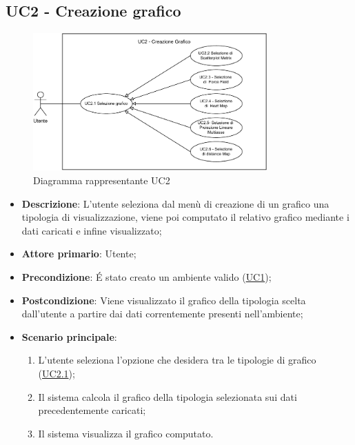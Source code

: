 \subsection{UC2 - Creazione grafico}
\label{sub:uc2}

\begin{figure}[h]
    \centering
    \includegraphics[width=0.8\textwidth]{componenti/casi-duso/diagrammi/UC2.pdf}
    \caption{Diagramma rappresentante UC2}
    \label{fig:UC2}
\end{figure}


\begin{itemize}
	\item \textbf{Descrizione}: L’utente seleziona dal menù di creazione di un grafico una tipologia di 
	visualizzazione, viene poi computato il relativo grafico mediante i dati caricati e infine visualizzato;
	
    \item \textbf{Attore primario}: Utente;
    
    \item \textbf{Precondizione}:   É stato creato un ambiente valido (\hyperref[sub:uc1]{UC1});

	\item \textbf{Postcondizione}:  Viene visualizzato il grafico della tipologia scelta dall'utente a partire dai dati 
	correntemente presenti nell'ambiente; 

	\item \textbf{Scenario principale}:
		\begin{enumerate}
			\item L'utente seleziona l'opzione che desidera tra le tipologie di grafico (\hyperref[ssub:uc2.1]{UC2.1});
			\item Il sistema calcola il grafico della tipologia selezionata sui dati precedentemente caricati;
			\item Il sistema visualizza il grafico computato.
		\end{enumerate}
\end{itemize}

